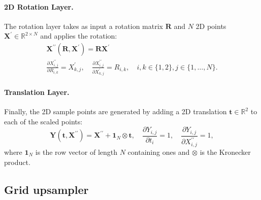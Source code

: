 \documentclass[runningheads]{llncs}
\newcommand{\R}{\mathbb{R}}
\begin{document}
\paragraph{2D Rotation Layer.}

The rotation layer takes as input a rotation matrix $\mathbf{R}$ and $N$ 2D points $\mathbf{X}^{\prime}\in\R^{2\times N}$ and applies the rotation:
\begin{gather*}
    \mathbf{X}^{\prime\prime}(\mathbf{R},\mathbf{X}^{\prime})=\mathbf{RX}^{\prime}\\
    \frac{\partial X^{\prime\prime}_{i,j}}{\partial R_{i,k}}=X^{\prime}_{k,j},\quad \frac{\partial X^{\prime\prime}_{i,j}}{\partial X^{\prime}_{k,j}}=R_{i,k},\quad i,k\in\{1,2\}, j\in\{1,\dots,N\}.
\end{gather*}

\paragraph{Translation Layer.}
Finally, the 2D sample points are generated by adding a 2D translation $\mathbf{t}\in\R^2$ to each of the scaled points:
\begin{equation*}
    \mathbf{Y}(\mathbf{t},\mathbf{X}^{\prime\prime})=\mathbf{X}^{\prime\prime}+\mathbf{1}_{N}\otimes \mathbf{t},\quad \frac{\partial Y_{i,j}}{\partial t_i}=1,\quad \frac{\partial Y_{i,j}}{\partial X^{\prime\prime}_{i,j}}=1,
\end{equation*}
where $\mathbf{1}_{N}$ is the row vector of length $N$ containing ones and $\otimes$ is the Kronecker product.

\subsection{Grid upsampler}
\end{document}
